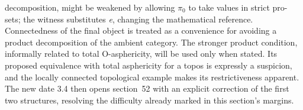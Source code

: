 decomposition, might be weakened by allowing $\pi_0$ to take values in strict pro-sets; the witness substitutes \emph{e}, changing the mathematical reference. Connectedness of the final object is treated as a convenience for avoiding a product decomposition of the ambient category. The stronger product condition, informally related to total O-asphericity, will be used only when stated. Its proposed equivalence with total asphericity for a topos is expressly a suspicion, and the locally connected topological example makes its restrictiveness apparent. The new date 3.4 then opens section~52 with an explicit correction of the first two structures, resolving the difficulty already marked in this section's margins.
